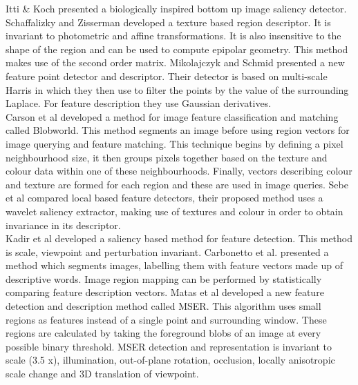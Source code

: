 Itti \& Koch \cite{Itti01Computational} presented a biologically inspired bottom up image saliency detector. Schaffalizky and Zisserman \cite{Schaffalitzky01Viewpoint} developed a texture based region descriptor. It is invariant to photometric and affine transformations. It is also insensitive to the shape of the region and can be used to compute epipolar geometry. This method makes use of the second order matrix. Mikolajczyk and Schmid \cite{Mikolajczyk01Indexing} presented a new feature point detector and descriptor. Their detector is based on multi-scale Harris in which they then use to filter the points by the value of the surrounding Laplace. For feature description they use Gaussian derivatives. \\


Carson et al \cite{Carson02Blobworld} developed a method for image feature classification and matching called Blobworld. This method segments an image before using region vectors for image querying and feature matching. This technique begins by defining a pixel neighbourhood size, it then groups pixels together based on the texture and colour data within one of these neighbourhoods. Finally, vectors describing colour and texture are formed for each region and these are used in image queries. Sebe et al \cite{Sebe03Evaluation} compared local based feature detectors, their proposed method uses a wavelet saliency extractor, making use of textures and colour in order to obtain invariance in its descriptor. \\


Kadir et al \cite{Kadir04Affine} developed a saliency based method for feature detection. This method is scale, viewpoint and perturbation invariant. Carbonetto et al. \cite{Carbonetto04Statistical} presented a method which segments images, labelling them with feature vectors made up of descriptive words. Image region mapping can be performed by statistically comparing feature description vectors. Matas et al \cite{Matas04Robust} developed a new feature detection and description method called MSER. This algorithm uses small regions as features instead of a single point and surrounding window. These regions are calculated by taking the foreground blobs of an image at every possible binary threshold. MSER detection and representation is invariant to scale (3.5 x), illumination, out-of-plane rotation, occlusion, locally anisotropic scale change and 3D translation of viewpoint. \\

